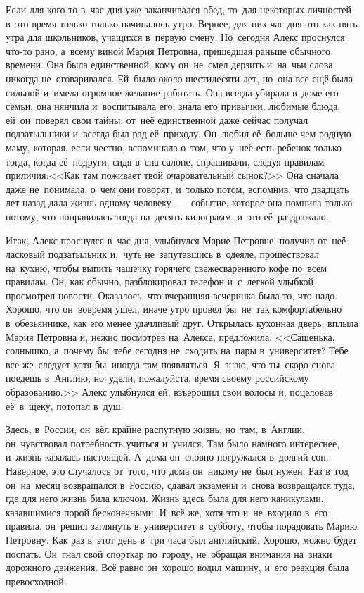 \vspace{1cm}

Если для кого-то в~час дня уже заканчивался обед, то~для некоторых личностей в~это время только-только начиналось утро.
Вернее, для них час дня это как пять утра для школьников, учащихся в~первую смену.
Но~сегодня Алекс проснулся что-то рано, а~всему виной Мария Петровна, пришедшая раньше обычного времени.
Она была единственной, кому он~не~смел дерзить и~на~чьи слова никогда не~оговаривался.
Ей~было около шестидесяти лет, но~она все ещё была сильной и~имела огромное желание работать.
Она всегда убирала в~доме его семьи, она нянчила и~воспитывала его, знала его привычки, любимые блюда, ей~он~поверял свои тайны, от~неё единственной даже сейчас получал подзатыльники и~всегда был рад её~приходу.
Он~любил её~больше чем родную маму, которая, если честно, вспоминала о~том, что у~неё есть ребенок только тогда, когда её~подруги, сидя в~спа-салоне, спрашивали, следуя правилам приличия:<<Как там поживает твой очаровательный сынок?>>
Она сначала даже не~понимала, о~чем они говорят, и~только потом, вспомнив, что двадцать лет назад дала жизнь одному человеку~---~событие, которое она помнила только потому, что поправилась тогда на~десять килограмм, и~это её~раздражало.

Итак, Алекс проснулся в~час дня, улыбнулся Марие Петровне, получил от~неё ласковый подзатыльник и,~чуть не~запутавшись в~одеяле, прошествовал на~кухню, чтобы выпить чашечку горячего свежесваренного кофе по~всем правилам.
Он, как обычно, разблокировал телефон и~с~легкой улыбкой просмотрел новости.
Оказалось, что вчерашняя вечеринка была то, что надо.
Хорошо, что он~вовремя ушёл, иначе утро провел бы~не~так комфортабельно в~обезьяннике, как его менее удачливый друг.
Открылась кухонная дверь, вплыла Мария Петровна и, нежно посмотрев на~Алекса, предложила: <<Сашенька, солнышко, а~почему бы~тебе сегодня не~сходить на~пары в~университет? Тебе все же~следует хотя бы~иногда там появляться.
Я~знаю, что ты~скоро снова поедешь в~Англию, но~удели, пожалуйста, время своему российскому образованию.>>
Алекс улыбнулся ей, взъерошил свои волосы и, поцеловав её~в~щеку, потопал в~душ.
 
Здесь, в~России, он~вёл крайне распутную жизнь, но~там, в~Англии, он~чувствовал потребность учиться и~учился.
Там было намного интереснее, и~жизнь казалась настоящей.
А~дома он~словно погружался в~долгий сон.
Наверное, это случалось от~того, что дома он~никому не~был нужен.
Раз в~год он~на~месяц возвращался в~Россию, сдавал экзамены и~снова возвращался туда, где для него жизнь била ключом.
Жизнь здесь была для него каникулами, казавшимися порой бесконечными.
И~всё же, хотя это и~не~входило в~его правила, он~решил заглянуть в~университет в~субботу, чтобы порадовать Марию Петровну.
Как раз в~этот день в~три часа был английский.
Хорошо, можно будет поспать.
Он~гнал свой спорткар по~городу, не~обращая внимания на~знаки дорожного движения.
Всё равно он~хорошо водил машину, и~его реакция была превосходной.
 
